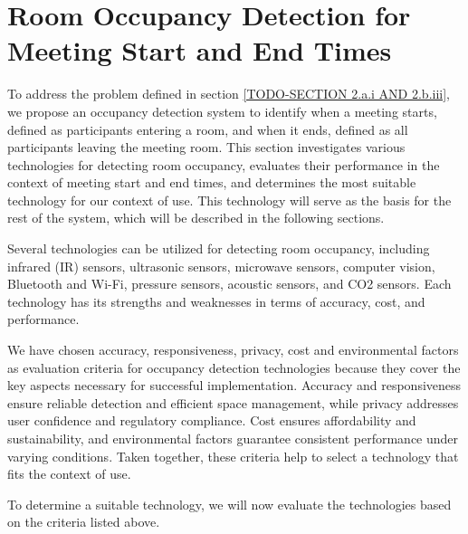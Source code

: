 \section{\label{sec:presence_intro}Room Occupancy Detection for Meeting Start and End Times}

To address the problem defined in section \ref{TODO-SECTION 2.a.i AND 2.b.iii}, we propose an occupancy detection system to identify when a meeting starts, defined as participants entering a room, and when it ends, defined as all participants leaving the meeting room.
This section investigates various technologies for detecting room occupancy, evaluates their performance in the context of meeting start and end times, and determines the most suitable technology for our context of use.
This technology will serve as the basis for the rest of the system, which will be described in the following sections.

Several technologies can be utilized for detecting room occupancy, including infrared (IR) sensors\cite{woodward-2021}\cite{dodierBuildingOccupancyDetection2006}\cite{OccupancySensorMotion}, ultrasonic sensors\cite{woodward-2021}\cite{dodierBuildingOccupancyDetection2006}\cite{OccupancySensorMotion}, microwave sensors\cite{woodward-2021}, computer vision\cite{co2sensor}\cite{longoAccurateOccupancyEstimation2019}\cite{OccupancySensorMotion}, Bluetooth and Wi-Fi\cite{teissedre-2019}, pressure sensors\cite{OccupancySensorMotion}, acoustic sensors\cite{OccupancySensorMotion}, and CO2 sensors\cite{co2sensor}\cite{longoAccurateOccupancyEstimation2019}\cite{jinSensingProxyOccupancy2015}.\cite{faragherLocationFingerprintingBluetooth2015}
Each technology has its strengths and weaknesses in terms of accuracy, cost, and performance.

We have chosen accuracy, responsiveness, privacy, cost and environmental factors as evaluation criteria for occupancy detection technologies because they cover the key aspects necessary for successful implementation.
Accuracy and responsiveness ensure reliable detection and efficient space management, while privacy addresses user confidence and regulatory compliance.
Cost ensures affordability and sustainability, and environmental factors guarantee consistent performance under varying conditions.
Taken together, these criteria help to select a technology that fits the context of use.

To determine a suitable technology, we will now evaluate the technologies based on the criteria listed above.


